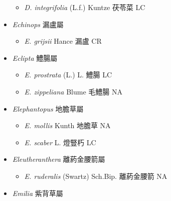 \begin{itemize}
  \begin{itemize}
        \item[] \textit{D. integrifolia} (L.f.) Kuntze  茯苓菜   LC
  \end{itemize}
 \item[] \textit{Echinops} 漏盧屬
                                
  \begin{itemize}
        \item[] \textit{E. grijsii} Hance  漏盧   CR
  \end{itemize}
 \item[] \textit{Eclipta} 鱧腸屬
                                
  \begin{itemize}
        \item[] \textit{E. prostrata} (L.) L.  鱧腸   LC
        \item[] \textit{E. zippeliana} Blume  毛鱧腸   NA
  \end{itemize}
 \item[] \textit{Elephantopus} 地膽草屬
                                
  \begin{itemize}
        \item[] \textit{E. mollis} Kunth  地膽草   NA
        \item[] \textit{E. scaber} L.  燈豎朽   LC
  \end{itemize}
 \item[] \textit{Eleutheranthera} 離葯金腰箭屬
                                
  \begin{itemize}
        \item[] \textit{E. ruderalis} (Swartz) Sch.Bip.  離葯金腰箭   NA
  \end{itemize}
 \item[] \textit{Emilia} 紫背草屬
                                

\end{itemize}
